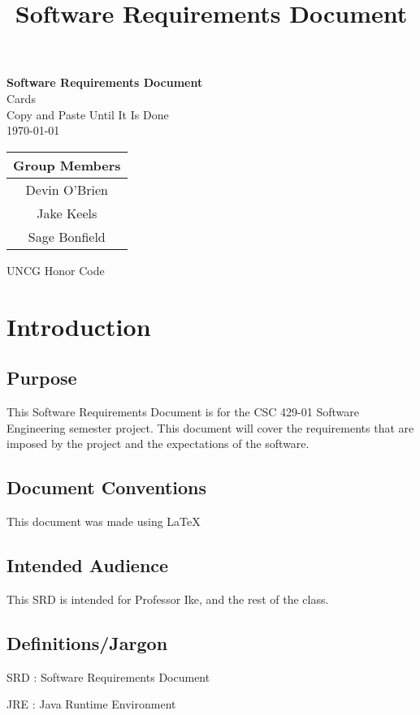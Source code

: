 \documentclass[12pt]{article}
\title{Software Requirements Document}
\begin{document}
\begin{titlepage}
\begin{center}
\Huge
\textbf{Software Requirements Document}\\
\huge Cards\\
\Large
Copy and Paste Until It Is Done\\
\Large \today\\
\begin{tabular}{|c|}
\hline
Group Members\\
\hline
Devin O'Brien\\
Jake Keels\\
Sage Bonfield\\
\hline
\end{tabular}
\large UNCG Honor Code
\end{center}
\end{titlepage}
\section{Introduction}\label{introduction}

\tableofcontents

\newpage
\subsection{Purpose}

This Software Requirements Document is for the CSC 429-01 Software
Engineering semester project. This document will cover the requirements
that are imposed by the project and the expectations of the software.


\subsection{Document Conventions}
This document was made using \LaTeX

\subsection{Intended Audience}
This SRD is intended for Professor Ike, and the rest of the class.

\subsection{Definitions/Jargon}

SRD : Software Requirements Document

JRE : Java Runtime Environment
\end{document}
